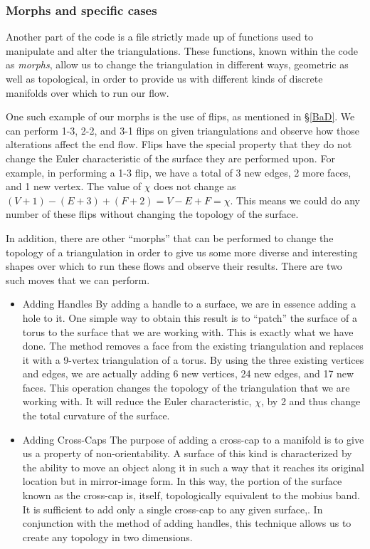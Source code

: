 \documentclass[12pt]{article}
\begin{document}
\subsubsection{Morphs and specific cases}

Another part of the code is a file strictly made up of functions used to manipulate and alter the triangulations. These functions, known within the code as \textit{morphs}, allow us to change the triangulation in different ways, geometric as well as topological, in order to provide us with different kinds of discrete manifolds over which to run our flow.\newline

\noindent One such example of our morphs is the use of flips, as mentioned in \S\ref{BaD}. We can perform 1-3, 2-2, and 3-1 flips on given triangulations and observe how those alterations affect the end flow. Flips have the special property that they do not change the Euler characteristic of the surface they are performed upon. For example, in performing a 1-3 flip, we have a total of 3 new edges, 2 more faces, and 1 new vertex. The value of $\chi$ does not change as $(V+1) - (E+3) + (F+2) = V - E + F = \chi$. This means we could do any number of these flips without changing the topology of the surface.\newline

\noindent In addition, there are other ``morphs'' that can be performed to change the topology of a triangulation in order to give us some more diverse and interesting shapes over which to run these flows and observe their results. There are two such moves that we can perform.

\begin{itemize}
\item Adding Handles \newline
By adding a handle to a surface, we are in essence adding a hole to it. One simple way to obtain this result is to ``patch'' the surface of a torus to the surface that we are working with. This is exactly what we have done. The method removes a face from the existing triangulation and replaces it with a 9-vertex triangulation of a torus. By using the three existing vertices and edges, we are actually adding 6 new vertices, 24 new edges, and 17 new faces. This operation changes the topology of the triangulation that we are working with. It will reduce the Euler characteristic, $\chi$, by 2 and thus change the total curvature of the surface.
\item Adding Cross-Caps \newline
The purpose of adding a cross-cap to a manifold is to give us a property of non-orientability. A surface of this kind is characterized by the ability to move an object along it in such a way that it reaches its original location but in mirror-image form. In this way, the portion of the surface known as the cross-cap is, itself, topologically equivalent to the mobius band. It is sufficient to add only a single cross-cap to any given surface,. In conjunction with the method of adding handles, this technique allows us to create any topology in two dimensions.
\end{itemize}
\end{document}
